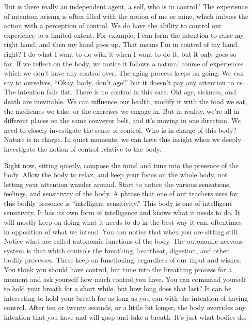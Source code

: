 But is there really an independent agent, a self, who is in control? The experience of intention arising is often filled with the notion of me or mine, which imbues the action with a perception of control. We do have the ability to control our experience to a limited extent. For example, I can form the intention to raise my right hand, and then my hand goes up. That means I'm in control of my hand, right? I do what I want to do with it when I want to do it, but it only goes so far. If we reflect on the body, we notice it follows a natural course of experiences which we don't have any control over. The aging process keeps on going. We can say to ourselves, ``Okay, body, don't age!'' but it doesn't pay any attention to us. The intention falls flat. There is no control in this case. Old age, sickness, and death are inevitable. We can influence our health, modify it with the food we eat, the medicines we take, or the exercises we engage in. But in reality, we're all in different places on the same conveyor belt, and it's moving in one direction. We need to closely investigate the sense of control. Who is in charge of this body? Nature is in charge. In quiet moments, we can have this insight when we deeply investigate the notion of control relative to the body.

Right now, sitting quietly, compose the mind and tune into the presence of the body. Allow the body to relax, and keep your focus on the whole body, not letting your attention wander around. Start to notice the various sensations, feelings, and sensitivity of the body. A phrase that one of our teachers uses for this bodily presence is ``intelligent sensitivity.'' This body is one of intelligent sensitivity. It has its own form of intelligence and knows what it needs to do. It will mostly keep on doing what it needs to do in the best way it can, oftentimes in opposition of what we intend. You can notice that when you are sitting still. Notice what are called autonomic functions of the body. The autonomic nervous system is that which controls the breathing, heartbeat, digestion, and other bodily processes. These keep on functioning, regardless of our input and wishes. You think you should have control, but tune into the breathing process for a moment and ask yourself how much control you have. You can command yourself to hold your breath for a short while, but how long does that last? It can be interesting to hold your breath for as long as you can with the intention of having control. After ten or twenty seconds, or a little bit longer, the body overrides any intention that you have and will gasp and take a breath. It's just what bodies do.

